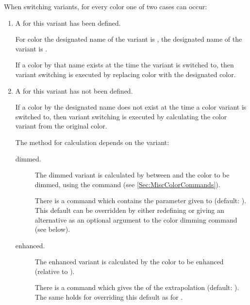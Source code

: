 \documentclass[12pt]{scrartcl}
\let\newslide=\relax
\begin{document}
  \newslide

  When switching variants, for every color one of two cases can occur:
  \begin{enumerate}
  \item A  for this variant has been defined.

    For color  the designated name of the 
     variant is , the designated
    name of the  variant is
    .

    If a color by that name exists at the time the variant is switched to, then variant switching is executed by
    replacing color  with the designated color.

    \newslide

  \item A  for this variant has not been defined.

    If a color by the designated name does not exist at the time a color variant is switched to, then variant switching
    is executed by  calculating the color variant from the original color.

    The method for calculation depends on the variant:

    \newslide

    \begin{description}
    \item[dimmed.] The dimmed variant is calculated by  between  and the color to
      be dimmed, using the  command (see \ref{Sec:MiscColorCommands}).

      There is a command 
      which contains the parameter  given to 
      (default: ).  This default can be overridden by either redefining
       or giving an alternative  as an optional
      argument to the color dimming command (see below).

      \newslide

    \item[enhanced.] The enhanced variant is calculated by  the color to be enhanced (relative to
      ).

      There is a command 
      which gives the  of the extrapolation (default: ).
      The same holds for overriding this default as for .
    \end{description}
  \end{enumerate}
\end{document}
